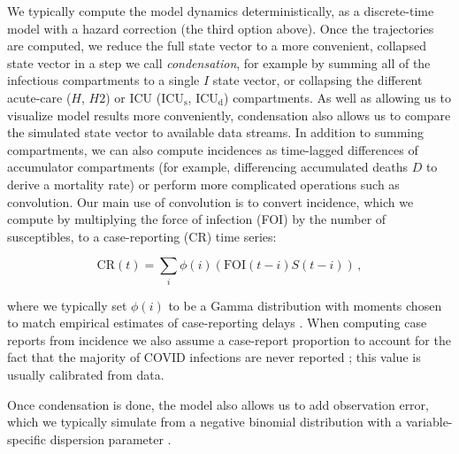 \documentclass[12pt]{article}\usepackage[]{graphicx}\usepackage[]{color}
\begin{document}
We typically compute the model dynamics deterministically, as a discrete-time model with a hazard correction (the third option above).  Once the trajectories are computed, we reduce the full state vector to a more convenient, collapsed state vector in a step we call \emph{condensation}, for example by summing all of the infectious compartments to a single $I$ state vector, or collapsing the different acute-care ($H$, $H2$) or ICU ($\textrm{ICU}_\textrm{s}$, $\textrm{ICU}_\textrm{d}$) compartments.
As well as allowing us to visualize model results more conveniently, condensation also allows us to compare the simulated state vector to available data streams.
In addition to summing compartments, we can also compute incidences as time-lagged differences of accumulator compartments (for example, differencing accumulated deaths $D$ to derive a mortality rate) or perform more complicated operations such as convolution. 
Our main use of convolution is to convert incidence, which we compute by multiplying the force of infection (FOI) by the number of susceptibles, to a case-reporting (CR) time series: 
\begin{linenomath*}
\begin{equation}\label{eq:CR}
\textrm{CR}(t) = \sum_i \phi(i) (\textrm{FOI}(t-i) S(t-i))\,,
\end{equation}
\end{linenomath*}
where we typically set $\phi(i)$ to be a Gamma distribution with
moments chosen to match empirical estimates of case-reporting delays
.
When computing case reports from incidence we also assume a case-report proportion  to account for the fact that the majority of COVID infections are never reported \cite{Doug+2020}; this value is usually calibrated from data.

Once condensation is done, the model also allows us to add observation error, which we typically simulate from a negative binomial distribution with a variable-specific dispersion parameter \cite{linden2011using}.

\thickredline
\end{document}
